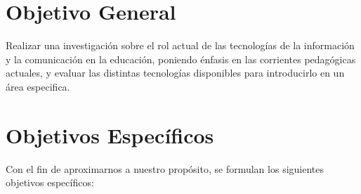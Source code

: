 \section{Objetivo General}
\label{sec:objetivos_generales}

Realizar una investigación sobre el rol actual de las tecnologías de la
información y la comunicación en la educación, poniendo énfasis en las 
corrientes pedagógicas actuales, y evaluar las distintas tecnologías 
disponibles para introducirlo en un área especifica.

\section{Objetivos Específicos}

Con el fin de aproximarnos a nuestro propósito, se formulan los siguientes
objetivos específicos:

